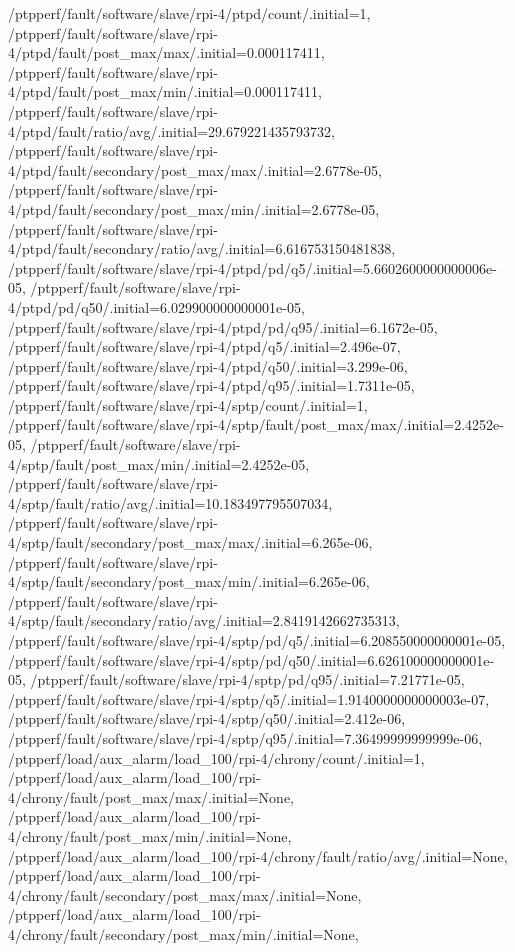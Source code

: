 {    /ptpperf/fault/software/slave/rpi-4/ptpd/count/.initial=1,
    /ptpperf/fault/software/slave/rpi-4/ptpd/fault/post_max/max/.initial=0.000117411,
    /ptpperf/fault/software/slave/rpi-4/ptpd/fault/post_max/min/.initial=0.000117411,
    /ptpperf/fault/software/slave/rpi-4/ptpd/fault/ratio/avg/.initial=29.679221435793732,
    /ptpperf/fault/software/slave/rpi-4/ptpd/fault/secondary/post_max/max/.initial=2.6778e-05,
    /ptpperf/fault/software/slave/rpi-4/ptpd/fault/secondary/post_max/min/.initial=2.6778e-05,
    /ptpperf/fault/software/slave/rpi-4/ptpd/fault/secondary/ratio/avg/.initial=6.616753150481838,
    /ptpperf/fault/software/slave/rpi-4/ptpd/pd/q5/.initial=5.6602600000000006e-05,
    /ptpperf/fault/software/slave/rpi-4/ptpd/pd/q50/.initial=6.029900000000001e-05,
    /ptpperf/fault/software/slave/rpi-4/ptpd/pd/q95/.initial=6.1672e-05,
    /ptpperf/fault/software/slave/rpi-4/ptpd/q5/.initial=2.496e-07,
    /ptpperf/fault/software/slave/rpi-4/ptpd/q50/.initial=3.299e-06,
    /ptpperf/fault/software/slave/rpi-4/ptpd/q95/.initial=1.7311e-05,
    /ptpperf/fault/software/slave/rpi-4/sptp/count/.initial=1,
    /ptpperf/fault/software/slave/rpi-4/sptp/fault/post_max/max/.initial=2.4252e-05,
    /ptpperf/fault/software/slave/rpi-4/sptp/fault/post_max/min/.initial=2.4252e-05,
    /ptpperf/fault/software/slave/rpi-4/sptp/fault/ratio/avg/.initial=10.183497795507034,
    /ptpperf/fault/software/slave/rpi-4/sptp/fault/secondary/post_max/max/.initial=6.265e-06,
    /ptpperf/fault/software/slave/rpi-4/sptp/fault/secondary/post_max/min/.initial=6.265e-06,
    /ptpperf/fault/software/slave/rpi-4/sptp/fault/secondary/ratio/avg/.initial=2.8419142662735313,
    /ptpperf/fault/software/slave/rpi-4/sptp/pd/q5/.initial=6.208550000000001e-05,
    /ptpperf/fault/software/slave/rpi-4/sptp/pd/q50/.initial=6.626100000000001e-05,
    /ptpperf/fault/software/slave/rpi-4/sptp/pd/q95/.initial=7.21771e-05,
    /ptpperf/fault/software/slave/rpi-4/sptp/q5/.initial=1.9140000000000003e-07,
    /ptpperf/fault/software/slave/rpi-4/sptp/q50/.initial=2.412e-06,
    /ptpperf/fault/software/slave/rpi-4/sptp/q95/.initial=7.36499999999999e-06,
    /ptpperf/load/aux_alarm/load_100/rpi-4/chrony/count/.initial=1,
    /ptpperf/load/aux_alarm/load_100/rpi-4/chrony/fault/post_max/max/.initial=None,
    /ptpperf/load/aux_alarm/load_100/rpi-4/chrony/fault/post_max/min/.initial=None,
    /ptpperf/load/aux_alarm/load_100/rpi-4/chrony/fault/ratio/avg/.initial=None,
    /ptpperf/load/aux_alarm/load_100/rpi-4/chrony/fault/secondary/post_max/max/.initial=None,
    /ptpperf/load/aux_alarm/load_100/rpi-4/chrony/fault/secondary/post_max/min/.initial=None,
}
